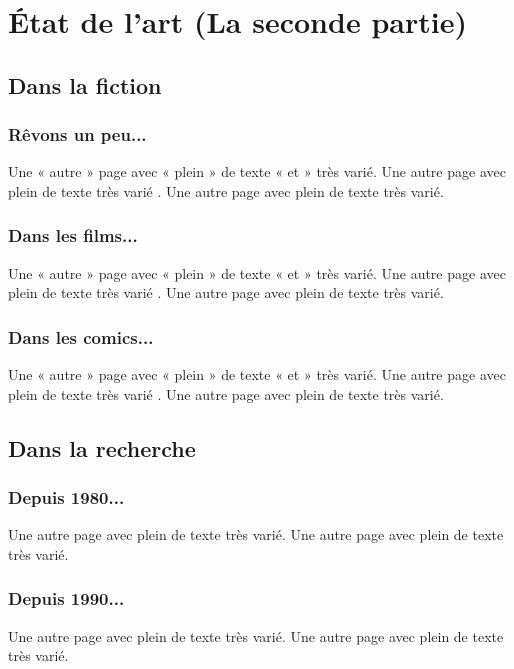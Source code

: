 \part{État de l'art (La seconde partie)}
    \label{PARTIE_2_ETAT_DE_L_ART}
\minitoc

\chapter{Dans la fiction}

    \section{Rêvons un peu...}
        Une « autre » page avec « plein » de texte « et » très varié.
        Une autre page avec plein de texte très varié .
        Une autre page avec plein de texte très varié.

    \section{Dans les films...}
        Une « autre » page avec « plein » de texte « et » très varié.
        Une autre page avec plein de texte très varié .
        Une autre page avec plein de texte très varié.

    \section{Dans les comics...}
        Une « autre » page avec « plein » de texte « et » très varié.
        Une autre page avec plein de texte très varié .
        Une autre page avec plein de texte très varié.

\chapter{Dans la recherche}

    \section{Depuis 1980...}
        Une autre page avec plein de texte très varié.
        Une autre page avec plein de texte très varié.

    \section{Depuis 1990...}
        Une autre page avec plein de texte très varié.
        Une autre page avec plein de texte très varié.

